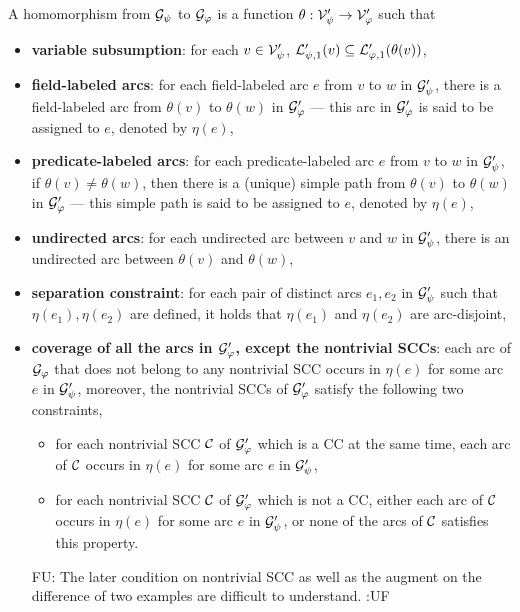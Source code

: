 \documentclass{llncs}
\newcommand{\fu}[1]{\color{purple} {FU: #1 :UF} \color{black}}
\begin{document}
\begin{definition}\label{def-hom-sleg}
A homomorphism from $\mathcal{G}_\psi$  to $\mathcal{G}_\varphi$ is a function $\theta: \mathcal{V}'_\psi \rightarrow \mathcal{V}'_{\varphi}$ such that
\begin{itemize}
\item{\bf variable subsumption}: for each $v \in \mathcal{V}'_{\psi}$, $\mathcal{L}'_{\psi,1}(v) \subseteq \mathcal{L}'_{\varphi,1}(\theta(v))$,
%
%
\item{\bf field-labeled arcs}: for each field-labeled arc $e$ from $v$ to $w$ in $\mathcal{G}'_{\psi}$, there is a  field-labeled arc from $\theta(v)$ to $\theta(w)$ in $\mathcal{G}'_{\varphi}$ --- this arc in $\mathcal{G}'_{\varphi}$ is said to be assigned to $e$, denoted by $\eta(e)$,
%
\item{\bf predicate-labeled arcs}: for each predicate-labeled arc $e$ from $v$ to $w$ in $\mathcal{G}'_{\psi}$, if $\theta(v) \neq \theta(w)$, then there is a (unique) simple path from $\theta(v)$ to $\theta(w)$ in $\mathcal{G}'_{\varphi}$ --- this simple path is said to be assigned to $e$, denoted by $\eta(e)$,
%
\item {\bf undirected arcs}: for each undirected arc between $v$ and $w$ in $\mathcal{G}'_\psi$, there is an undirected arc between $\theta(v)$ and $\theta(w)$,

\item {\bf separation constraint}: for each pair of distinct arcs $e_1,e_2$ in $\mathcal{G}'_\psi$ such that $\eta(e_1),\eta(e_2)$ are defined, it holds that $\eta(e_1)$ and $\eta(e_2)$ are arc-disjoint,
%
%
\item {\bf coverage of all the arcs in $\mathcal{G}'_{\varphi}$, except the nontrivial SCCs}: each arc of $\mathcal{G}_{\varphi}$ that does not belong to any nontrivial SCC occurs in $\eta(e)$ for some arc $e$ in $\mathcal{G}'_{\psi}$, moreover, the nontrivial SCCs of $\mathcal{G}'_\varphi$ satisfy the following two constraints,
\begin{itemize}
\item for each nontrivial SCC $\mathcal{C}$ of $\mathcal{G}'_\varphi$ which is a CC at the same time, each arc of $\mathcal{C}$ occurs in $\eta(e)$ for some arc $e$ in $\mathcal{G}'_\psi$,
%
\item for each nontrivial SCC $\mathcal{C}$ of $\mathcal{G}'_\varphi$ which is not a CC, either each arc of $\mathcal{C}$ occurs in $\eta(e)$ for some arc $e$ in $\mathcal{G}'_{\psi}$, or none of the arcs of $\mathcal{C}$ satisfies this property.
\end{itemize}
    \fu{The later condition on nontrivial SCC as well as the augment on the difference of two examples are difficult to understand.  }
\end{itemize}
\end{definition}
\end{document}
